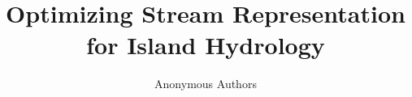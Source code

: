 \documentclass[journal]{IEEEtran}
\begin{document}
\title{Optimizing Stream Representation for Island Hydrology}
\author{Anonymous Authors}
\maketitle










\end{document}
